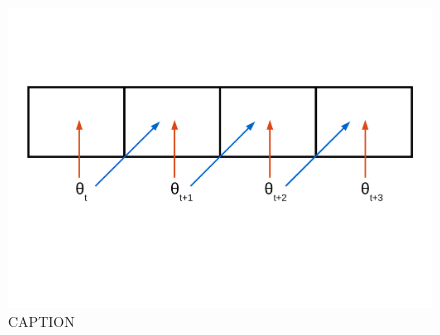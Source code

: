 \documentclass[12pt,letterpaper]{article}
\begin{document}
\begin{figure}[ht]
  \centering
  \includegraphics[height = 0.5\textheight, width = \textwidth, keepaspectratio = true]{figure/predict_perform}
  \caption{CAPTION}
  \label{fig:concept}
\end{figure}
\end{document}

